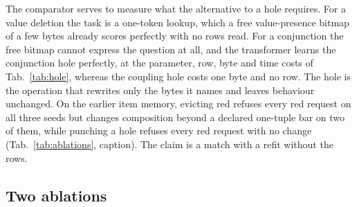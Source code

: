 \documentclass{article} %
\begin{document}
\noindent The comparator serves to measure what the alternative to a hole requires. For a value
deletion the task is a one-token lookup, which a free value-presence bitmap of a few bytes already scores
perfectly with no rows read. For a conjunction the free bitmap cannot express the question at
all, and the transformer learns the conjunction hole perfectly, at the parameter, row, byte and time
costs of Tab.~\ref{tab:hole}, whereas the coupling hole costs one
byte and no row. %
\noindent The hole is the operation that rewrites only the bytes it names and
leaves behaviour unchanged. On the earlier item memory, evicting red refuses every red request on all three
seeds but changes composition beyond a declared one-tuple bar on two of them,
while punching a hole refuses every red request with no change (Tab.~\ref{tab:ablations}, caption). %
The claim is a match with a refit without the rows.

\subsection{Two ablations}
\label{sec:ablations}
\end{document}

